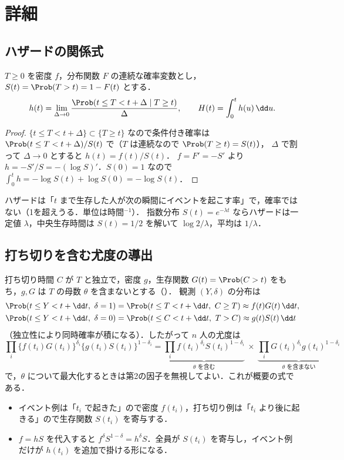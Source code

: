 \section{詳細}\label{sec:m01-shosai}
\subsection{ハザードの関係式}\label{subsec:m01-hazard}
\begin{teigi}[ハザード関数]\label{def:m01-hazard}
$T\ge0$ を密度 $f$，分布関数 $F$ の連続な確率変数とし，$S(t)=\Prob(T>t)=1-F(t)$ とする．
\[
h(t)=\lim_{\Delta\to0}\frac{\Prob(t\le T<t+\Delta\mid T\ge t)}{\Delta},\qquad H(t)=\int_0^th(u)\,\dd u .
\]
\end{teigi}
\begin{proof}
$\{t\le T<t+\Delta\}\subset\{T\ge t\}$ なので条件付き確率は $\Prob(t\le T<t+\Delta)/S(t)$ で（$T$ は連続なので $\Prob(T\ge t)=S(t)$），
$\Delta$ で割って $\Delta\to0$ とすると $h(t)=f(t)/S(t)$．
$f=F'=-S'$ より $h=-S'/S=-(\log S)'$．$S(0)=1$ なので $\int_0^th=-\log S(t)+\log S(0)=-\log S(t)$．
\end{proof}
ハザードは「$t$ まで生存した人が次の瞬間にイベントを起こす率」で，確率ではない（1を超えうる．単位は時間$^{-1}$）．
指数分布 $S(t)=e^{-\lambda t}$ ならハザードは一定値 $\lambda$，中央生存時間は $S(t)=1/2$ を解いて $\log2/\lambda$，平均は $1/\lambda$．

\subsection{打ち切りを含む尤度の導出}\label{subsec:m01-lik}
打ち切り時間 $C$ が $T$ と独立で，密度 $g$，生存関数 $G(t)=\Prob(C>t)$ をもち，$g,G$ は $T$ の母数 $\theta$ を含まないとする（）．
観測 $(Y,\delta)$ の分布は
\begin{align*}
\Prob(t\le Y<t+\dd t,\ \delta=1)&=\Prob(t\le T<t+\dd t,\ C\ge T)\approx f(t)G(t)\,\dd t,\\
\Prob(t\le Y<t+\dd t,\ \delta=0)&=\Prob(t\le C<t+\dd t,\ T>C)\approx g(t)S(t)\,\dd t
\end{align*}
（独立性により同時確率が積になる）．したがって $n$ 人の尤度は
\[
\prod_i\{f(t_i)G(t_i)\}^{\delta_i}\{g(t_i)S(t_i)\}^{1-\delta_i}
=\underbrace{\prod_if(t_i)^{\delta_i}S(t_i)^{1-\delta_i}}_{\theta\text{ を含む}}\ \times\ \underbrace{\prod_iG(t_i)^{\delta_i}g(t_i)^{1-\delta_i}}_{\theta\text{ を含まない}}
\]
で，$\theta$ について最大化するときは第2の因子を無視してよい．これが概要の式である．
\begin{itemize}
\item イベント例は「$t_i$ で起きた」ので密度 $f(t_i)$，打ち切り例は「$t_i$ より後に起きる」ので生存関数 $S(t_i)$ を寄与する．
\item $f=hS$ を代入すると $f^{\delta}S^{1-\delta}=h^{\delta}S$．全員が $S(t_i)$ を寄与し，イベント例だけが $h(t_i)$ を追加で掛ける形になる．
\end{itemize}

